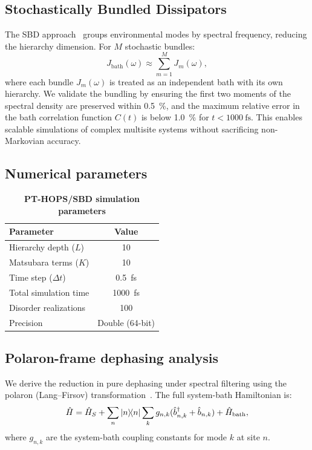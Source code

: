 \documentclass[11pt,a4paper]{article}
\begin{document}
\subsection{Stochastically Bundled Dissipators}

The SBD approach~\cite{Varvelo2021a} groups environmental modes by spectral frequency, reducing the hierarchy dimension. For $M$ stochastic bundles:
\begin{equation}
J_{\mathrm{bath}}(\omega) \approx \sum_{m=1}^{M} J_m(\omega),
\label{eq:SI_sbd}
\end{equation}
where each bundle $J_m(\omega)$ is treated as an independent bath with its own hierarchy. We validate the bundling by ensuring the first two moments of the spectral density are preserved within \SI{0.5}{\percent}, and the maximum relative error in the bath correlation function $C(t)$ is below \SI{1.0}{\percent} for $t < \SI{1000}{\femto\second}$. This enables scalable simulations of complex multisite systems without sacrificing non-Markovian accuracy.

\subsection{Numerical parameters}

\begin{table}[h]
\centering
\caption{\textbf{PT-HOPS/SBD simulation parameters}}
\label{tab:SI_parameters}
\begin{tabular}{lc}
\toprule
\textbf{Parameter} & \textbf{Value} \\
\midrule
Hierarchy depth ($L$) & 10 \\
Matsubara terms ($K$) & 10 \\
Time step ($\Delta t$) & \SI{0.5}{\femto\second} \\
Total simulation time & \SI{1000}{\femto\second} \\
Disorder realizations & 100 \\
Precision & Double (64-bit) \\
\bottomrule
\end{tabular}
\end{table}

\subsection{Polaron-frame dephasing analysis}
\label{sec:polaron_dephasing}

We derive the reduction in pure dephasing under spectral filtering using the polaron (Lang--Firsov) transformation~\cite{Huelga2013,Chin2011}. The full system-bath Hamiltonian is:
\begin{equation}
\hat{H} = \hat{H}_S + \sum_n \dyad{n} \sum_k g_{n,k}(\hat{b}_{n,k}^\dagger + \hat{b}_{n,k}) + \hat{H}_{\mathrm{bath}},
\label{eq:SI_full_hamiltonian}
\end{equation}
where $g_{n,k}$ are the system-bath coupling constants for mode $k$ at site $n$.
\end{document}
